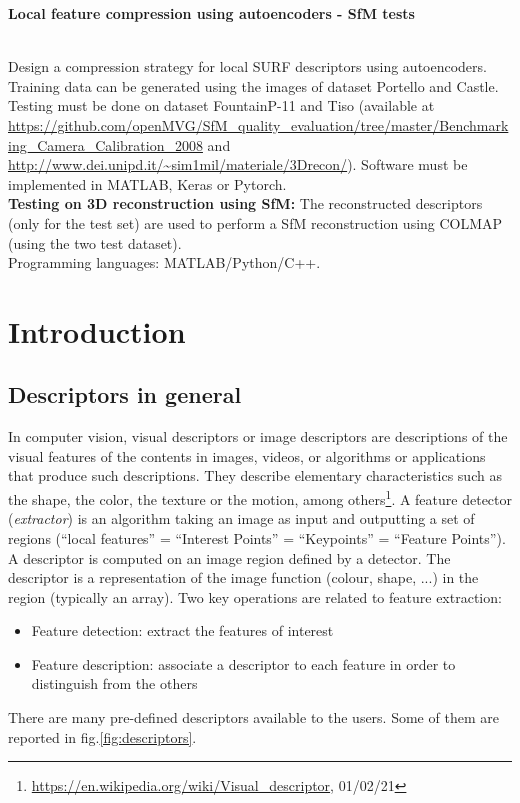 
{\raggedright\large\textbf{Local feature compression using autoencoders - SfM tests}}\smallskip \\ 
Design a compression strategy for local SURF descriptors using autoencoders. Training data can be generated using the images of dataset Portello and Castle. Testing must be done on dataset FountainP-11 and Tiso (available at \url{https://github.com/openMVG/SfM_quality_evaluation/tree/master/Benchmarking_Camera_Calibration_2008} and \url{http://www.dei.unipd.it/~sim1mil/materiale/3Drecon/}). Software must be implemented in MATLAB, Keras or Pytorch. \\ \textbf{Testing on 3D reconstruction using SfM:} The reconstructed descriptors (only for the test set) are used to perform a SfM reconstruction using COLMAP (using the two test dataset). \\
Programming languages: MATLAB/Python/C++.

\section{Introduction}

\subsection{Descriptors in general}
In computer vision, visual descriptors or image descriptors are descriptions of the visual features of the contents in images, videos, or algorithms or applications that produce such descriptions. They describe elementary characteristics such as the shape, the color, the texture or the motion, among others\footnote{\url{https://en.wikipedia.org/wiki/Visual_descriptor}, 01/02/21}. A feature detector (\emph{extractor}) is an algorithm taking an image as input and outputting a set of regions (``local features'' = ``Interest Points'' = ``Keypoints'' = ``Feature Points''). A descriptor is computed on an image region defined by a detector. The descriptor is a representation of the image function (colour, shape, ...) in the region (typically an array). Two key operations are related to feature extraction:
\begin{itemize}
\item Feature detection: extract the features of interest
\item Feature description: associate a descriptor to each feature in order to distinguish from the others
\end{itemize}
There are many pre-defined descriptors available to the users. Some of them are reported in fig.\ref{fig:descriptors}.

